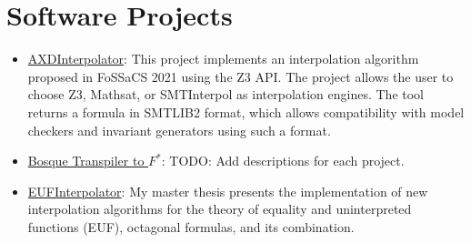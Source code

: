 \section{Software Projects}


\begin{itemize}
\item \href{https://github.com/typesAreSpaces/AXDInterpolator}{AXDInterpolator}:
  This project implements an interpolation algorithm proposed in FoSSaCS 2021 %
  using the Z3 API. %
  The project allows the user to choose Z3, Mathsat, or SMTInterpol as
  interpolation engines. The tool returns a formula in SMTLIB2 format, which
  allows compatibility with model checkers and invariant generators using such a
  format.
\item
  \href{https://github.com/typesAreSpaces/BosqueLanguage/tree/fstar-implementation/ref_impl}{Bosque
    Transpiler to $F^{*}$}: TODO: Add descriptions for each project.
\item \href{https://github.com/typesAreSpaces/EUFInterpolator}{EUFInterpolator}:
  My master thesis presents the implementation of new interpolation algorithms
  for the theory of equality and uninterpreted functions (EUF), octagonal
  formulas, and its combination.
\end{itemize}
